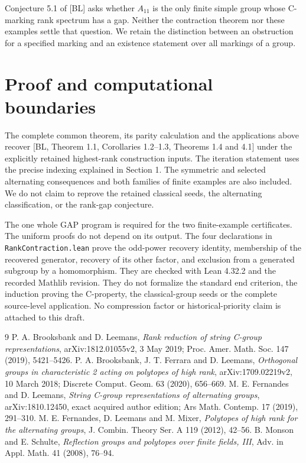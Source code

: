 \documentclass[a4paper,11pt]{article}
\begin{document}
Conjecture 5.1 of [BL] asks whether $A_{11}$ is the only finite simple group
whose C-marking rank spectrum has a gap. Neither the contraction theorem
nor these examples settle that question. We retain the distinction between
an obstruction for a specified marking and an existence statement over
all markings of a group.

\section{Proof and computational boundaries}
The complete common theorem, its parity calculation and the applications
above recover [BL, Theorem 1.1, Corollaries 1.2--1.3, Theorems 1.4 and 4.1]
under the explicitly retained highest-rank construction inputs. The
iteration statement uses the precise indexing explained in Section 1.
The symmetric and selected alternating consequences and both families of
finite examples are also included. We do not claim to reprove the retained
classical seeds, the alternating classification, or the rank-gap conjecture.

The one whole GAP program is required for the two finite-example certificates.
The uniform proofs do not depend on its output. The four declarations in \texttt{RankContraction.lean} prove the odd-power
recovery identity, membership of the recovered generator, recovery of its
other factor, and exclusion from a generated subgroup by a homomorphism.
They are checked with Lean 4.32.2 and the recorded Mathlib revision. They do
not formalize the standard end criterion, the induction proving the C-property,
the classical-group seeds or the complete source-level application. No compression factor or
historical-priority claim is attached to this draft.

\begin{thebibliography}{9}
 P. A. Brooksbank and D. Leemans, \emph{Rank reduction of string
C-group representations}, arXiv:1812.01055v2, 3 May 2019;
Proc. Amer. Math. Soc. 147 (2019), 5421--5426.
 P. A. Brooksbank, J. T. Ferrara and D. Leemans,
\emph{Orthogonal groups in characteristic 2 acting on polytopes of high rank},
arXiv:1709.02219v2, 10 March 2018; Discrete Comput. Geom. 63 (2020), 656--669.
 M. E. Fernandes and D. Leemans, \emph{String C-group
representations of alternating groups}, arXiv:1810.12450, exact acquired
author edition; Ars Math. Contemp. 17 (2019), 291--310.
 M. E. Fernandes, D. Leemans and M. Mixer, \emph{Polytopes
of high rank for the alternating groups}, J. Combin. Theory Ser. A 119
(2012), 42--56.
 B. Monson and E. Schulte, \emph{Reflection groups and polytopes
over finite fields, III}, Adv. in Appl. Math. 41 (2008), 76--94.
\end{thebibliography}
\end{document}
